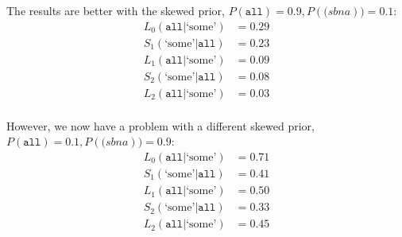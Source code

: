 \documentclass[12pt, a4paper, usenames, dvipsnames]{article}
\begin{document}
The results are better with the skewed prior, \(P(\texttt{all})=0.9, P(\texttt(sbna))=0.1\):
\begin{align*}
  L_0(\texttt{all}|\text{`some'}) & = 0.29\\
  S_1(\text{`some'}|\texttt{all}) & = 0.23\\
  L_1(\texttt{all}|\text{`some'}) & = 0.09\\
  S_2(\text{`some'}|\texttt{all}) & = 0.08\\  
  L_2(\texttt{all}|\text{`some'}) & = 0.03\\
\end{align*}

However, we now have a problem with a different skewed prior, \(P(\texttt{all})=0.1, P(\texttt(sbna))=0.9\):
\begin{align*}
  L_0(\texttt{all}|\text{`some'}) & = 0.71\\
  S_1(\text{`some'}|\texttt{all}) & = 0.41\\
  L_1(\texttt{all}|\text{`some'}) & = 0.50\\
  S_2(\text{`some'}|\texttt{all}) & = 0.33\\ 
  L_2(\texttt{all}|\text{`some'}) & = 0.45\\
\end{align*}
\end{document}
